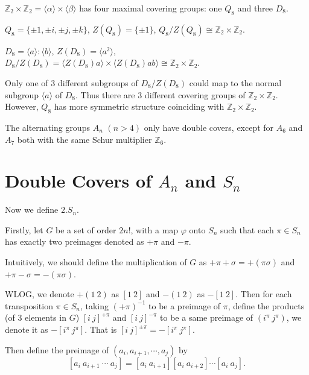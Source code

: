 \documentclass[a4paper,11pt]{article}
\def\subtitle#1{\section{#1}}
\begin{document}
\begin{example}
	$\mathbb{Z}_2\times\mathbb{Z}_2=\langle\alpha\rangle\times\langle\beta\rangle$ has four maximal covering groups: one $Q_8$ and three $D_8$. 

    $Q_8=\{\pm 1,\pm i,\pm j,\pm k\}$, $Z(Q_8)=\{\pm 1\}$, $Q_8/Z(Q_8)\cong\mathbb{Z}_2\times\mathbb{Z}_2$.
    
    $D_8=\langle a\rangle:\langle b\rangle$, $Z(D_8)=\langle a^2\rangle$, $D_8/Z(D_8)=\langle Z(D_8)a\rangle\times \langle Z(D_8)ab\rangle \cong\mathbb{Z}_2\times\mathbb{Z}_2$.
    
    Only one of 3 different subgroups of $D_8/Z(D_8)$ could map to the normal subgroup $\langle a\rangle$ of $D_8$. Thus there are 3 different covering groups of $\mathbb{Z}_2\times\mathbb{Z}_2$. However, $Q_8$ has more symmetric structure coinciding with $\mathbb{Z}_2\times\mathbb{Z}_2$. 
\end{example}

\begin{example}
    The alternating groups $A_n$ $(n > 4)$ only have double covers, except for $A_6$ and $A_7$ both with the same Schur multiplier $\mathbb{Z}_6$.
\end{example}




\subtitle{Double Covers of $A_n$ and $S_n$}

Now we define $2.S_n$.

Firstly, let $G$ be a set of order $2n!$, with a map $\varphi$ onto $S_n$ such that each $\pi\in S_n$ has exactly two preimages denoted as $+\pi$ and $-\pi$. 

Intuitively, we should define the multiplication of $G$ as $+\pi+\sigma=+(\pi\sigma)$ and $+\pi-\sigma=-(\pi\sigma)$. 

WLOG, we denote $+(1\ 2)$ as $[1\ 2]$ and $-(1\ 2)$ as $-[1\ 2]$. Then for each transposition $\pi\in S_n$, taking $(+\pi)^{-1}$ to be a preimage of $\pi$, define the products (of 3 elements in $G$) $[i\ j]^{+\pi}$ and $[i\ j]^{-\pi}$ to be a same preimage of $(i^\pi\ j^\pi)$, we denote it as $-[i^\pi\ j^\pi]$. That is $[i\ j]^{\pm\pi}=-[i^\pi\ j^\pi]$. 

Then define the preimage of $(a_i, a_{i+1},\cdots, a_j)$ by \[[a_i\ a_{i+1}\ \cdots\ a_j]=[a_i\ a_{i+1}][a_i\ a_{i+2}]\cdots[a_i\ a_j].\]
\end{document}
